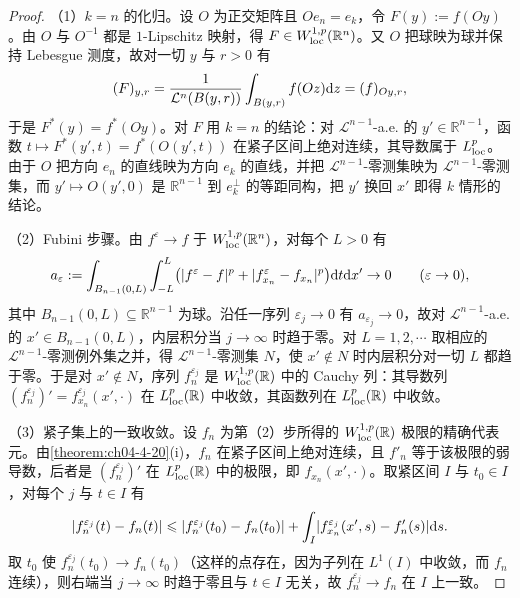 ﻿\documentclass[../../main.tex]{subfiles}%
\begin{document}
\begin{proof}
（1）$k=n$ 的化归。设 $O$ 为正交矩阵且 $Oe_{n}=e_{k}$，令 $F(y):=f(Oy)$。由 $O$ 与 $O^{-1}$ 都是 $1$-Lipschitz 映射，得 $F\in W^{1,p}_{\mathrm{loc}}(\mathbb{R}^{n})$。又 $O$ 把球映为球并保持 Lebesgue 测度，故对一切 $y$ 与 $r>0$ 有
\begin{align*}
(F)_{y,r}=\frac{1}{\mathcal{L}^{n}(B(y,r))}\int_{B(y,r)}f(Oz)\mathrm{d} z=(f)_{Oy,r},
\end{align*}
于是 $F^{*}(y)=f^{*}(Oy)$。对 $F$ 用 $k=n$ 的结论：对 $\mathcal{L}^{n-1}$-a.e. 的 $y'\in\mathbb{R}^{n-1}$，函数 $t\mapsto F^{*}(y',t)=f^{*}(O(y',t))$ 在紧子区间上绝对连续，其导数属于 $L^{p}_{\mathrm{loc}}$。由于 $O$ 把方向 $e_{n}$ 的直线映为方向 $e_{k}$ 的直线，并把 $\mathcal{L}^{n-1}$-零测集映为 $\mathcal{L}^{n-1}$-零测集，而 $y'\mapsto O(y',0)$ 是 $\mathbb{R}^{n-1}$ 到 $e_{k}^{\perp}$ 的等距同构，把 $y'$ 换回 $x'$ 即得 $k$ 情形的结论。

（2）Fubini 步骤。由 $f^{\varepsilon}\to f$ 于 $W^{1,p}_{\mathrm{loc}}(\mathbb{R}^{n})$，对每个 $L>0$ 有
\begin{align*}
a_{\varepsilon}:=\int_{B_{n-1}(0,L)}\int_{-L}^{L}\bigl(\lvert f^{\varepsilon}-f\rvert^{p}+\lvert f^{\varepsilon}_{x_{n}}-f_{x_{n}}\rvert^{p}\bigr)\mathrm{d} t\mathrm{d} x'\to0\qquad(\varepsilon\to0),
\end{align*}
其中 $B_{n-1}(0,L)\subseteq\mathbb{R}^{n-1}$ 为球。沿任一序列 $\varepsilon_{j}\to0$ 有 $a_{\varepsilon_{j}}\to0$，故对 $\mathcal{L}^{n-1}$-a.e. 的 $x'\in B_{n-1}(0,L)$，内层积分当 $j\to\infty$ 时趋于零。对 $L=1,2,\cdots$ 取相应的 $\mathcal{L}^{n-1}$-零测例外集之并，得 $\mathcal{L}^{n-1}$-零测集 $N$，使 $x'\notin N$ 时内层积分对一切 $L$ 都趋于零。于是对 $x'\notin N$，序列 $f^{\varepsilon_{j}}_{n}$ 是 $W^{1,p}_{\mathrm{loc}}(\mathbb{R})$ 中的 Cauchy 列：其导数列 $(f^{\varepsilon_{j}}_{n})'=f^{\varepsilon_{j}}_{x_{n}}(x',\cdot)$ 在 $L^{p}_{\mathrm{loc}}(\mathbb{R})$ 中收敛，其函数列在 $L^{p}_{\mathrm{loc}}(\mathbb{R})$ 中收敛。

（3）紧子集上的一致收敛。设 $f_{n}$ 为第（2）步所得的 $W^{1,p}_{\mathrm{loc}}(\mathbb{R})$ 极限的精确代表元。由\cref{theorem:ch04-4-20}(i)，$f_{n}$ 在紧子区间上绝对连续，且 $f'_{n}$ 等于该极限的弱导数，后者是 $(f^{\varepsilon_{j}}_{n})'$ 在 $L^{p}_{\mathrm{loc}}(\mathbb{R})$ 中的极限，即 $f_{x_{n}}(x',\cdot)$。取紧区间 $I$ 与 $t_{0}\in I$，对每个 $j$ 与 $t\in I$ 有 %
\begin{align*}
\lvert f^{\varepsilon_{j}}_{n}(t)-f_{n}(t)\rvert\leqslant\lvert f^{\varepsilon_{j}}_{n}(t_{0})-f_{n}(t_{0})\rvert+\int_{I}\lvert f^{\varepsilon_{j}}_{x_{n}}(x',s)-f'_{n}(s)\rvert\mathrm{d} s .
\end{align*}
取 $t_{0}$ 使 $f^{\varepsilon_{j}}_{n}(t_{0})\to f_{n}(t_{0})$（这样的点存在，因为子列在 $L^{1}(I)$ 中收敛，而 $f_{n}$ 连续），则右端当 $j\to\infty$ 时趋于零且与 $t\in I$ 无关，故 $f^{\varepsilon_{j}}_{n}\to f_{n}$ 在 $I$ 上一致。


\end{proof}
\end{document}
